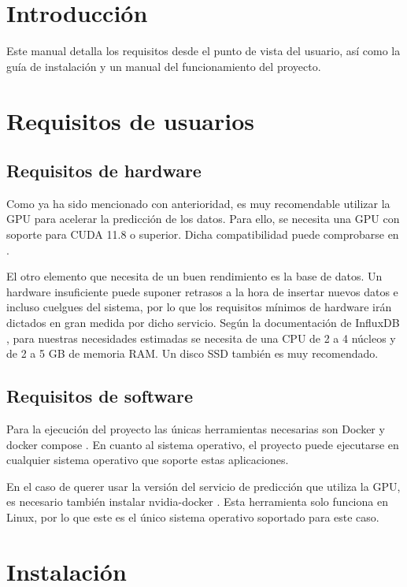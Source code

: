 
\section{Introducción}

Este manual detalla los requisitos desde el punto de vista del usuario, así como la guía de instalación y 
un manual del funcionamiento del proyecto.

\section{Requisitos de usuarios}

\subsection{Requisitos de hardware}
Como ya ha sido mencionado con anterioridad, es muy recomendable utilizar la GPU para acelerar la predicción de 
los datos. Para ello, se necesita una GPU con soporte para CUDA 11.8 o superior. Dicha compatibilidad puede
comprobarse en \cite{cuda-compatibility}.

El otro elemento que necesita de un buen rendimiento es la base de datos. Un hardware insuficiente puede suponer 
retrasos a la hora de insertar nuevos datos e incluso cuelgues del sistema, por lo que los requisitos mínimos de 
hardware irán dictados en gran medida por dicho servicio. Según la documentación de InfluxDB \cite{influx:requirements}, para nuestras necesidades 
estimadas se necesita de una CPU de 2 a 4 núcleos y de 2 a 5 GB de memoria RAM. Un disco SSD también es muy recomendado.

\subsection{Requisitos de software}
Para la ejecución del proyecto las únicas herramientas necesarias son Docker \cite{docker-pag} y docker compose \cite{compose}.
En cuanto al sistema operativo, el proyecto puede ejecutarse en cualquier sistema operativo que soporte estas aplicaciones.

En el caso de querer usar la versión del servicio de predicción que utiliza la GPU, es necesario también instalar 
nvidia-docker \cite{nvidia-docker}. Esta herramienta solo funciona en Linux, por lo que este es el único sistema 
operativo soportado para este caso.

\section{Instalación}

